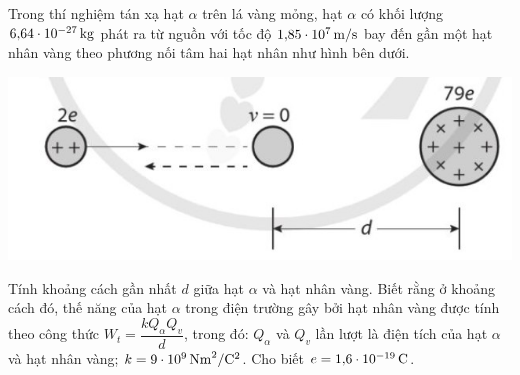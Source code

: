 \begin{ex}
	Trong thí nghiệm tán xạ hạt $\alpha$ trên lá vàng mỏng, hạt $\alpha$ có khối lượng $\SI{6.64E-27}{\kilogram}$ phát ra từ nguồn với tốc độ $\SI{1.85E7}{\meter/\second}$ bay đến gần một hạt nhân vàng theo phương nối tâm hai hạt nhân như hình bên dưới.
	\begin{center}
		\includegraphics[width=0.4\linewidth]{figs/VN12-Y24-PH-SYL-026P-2}
	\end{center}
	Tính khoảng cách gần nhất $d$ giữa hạt $\alpha$ và hạt nhân vàng. Biết rằng ở khoảng cách đó, thế năng của hạt $\alpha$ trong điện trường gây bởi hạt nhân vàng được tính theo công thức $W_t=\dfrac{k Q_\alpha Q_{v}}{d}$, trong đó: $Q_\alpha$ và $Q_{v}$ lần lượt là điện tích của hạt $\alpha$ và hạt nhân vàng; $k=\SI{9E9}{\newton\meter^2/\coulomb^2}$. Cho biết $e=\SI{1.6E-19}{\coulomb}$.
\end{ex}

